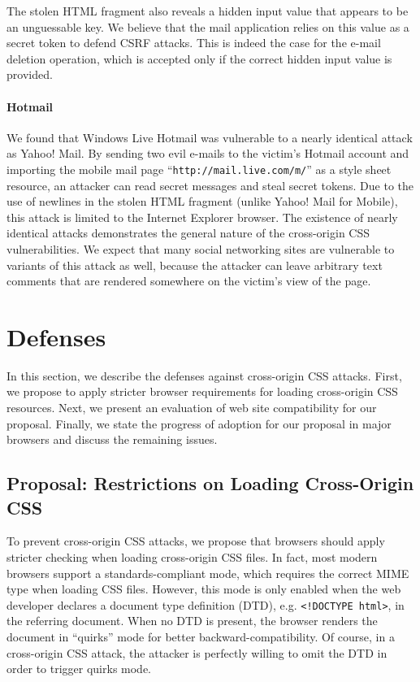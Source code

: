 \documentclass{acm_proc_article-sp}
\begin{document}
The stolen HTML fragment also reveals a hidden input value that appears to be an unguessable key. We believe that the mail application relies on this value as a secret token to defend CSRF attacks. This is indeed the case for the e-mail deletion operation, which is accepted only if the correct hidden input value is provided.

\paragraph{Hotmail}
We found that Windows Live Hotmail was vulnerable to a nearly identical attack as Yahoo! Mail. By sending two evil e-mails to the victim's Hotmail account and importing the mobile mail page ``\texttt{http://mail.live.com/m/}'' as a style sheet resource, an attacker can read secret messages and steal secret tokens. Due to the use of newlines in the stolen HTML fragment (unlike Yahoo! Mail for Mobile), this attack is limited to the Internet Explorer browser.
The existence of nearly identical attacks demonstrates the general nature of the cross-origin CSS vulnerabilities. We expect that many social networking sites are vulnerable to variants of this attack as well, because the attacker can leave arbitrary text comments that are rendered somewhere on the victim's view of the page.

\section{Defenses} \label{sec:defenses}
In this section, we describe the defenses against cross-origin CSS attacks.
First, we propose to apply stricter browser requirements for loading
cross-origin CSS resources. Next, we present an evaluation of web site
compatibility for our proposal. Finally, we state the progress of adoption for
our proposal in major browsers and discuss the remaining issues.

\subsection{Proposal: Restrictions on Loading Cross-Origin CSS} \label{sec:proposal}
To prevent cross-origin
CSS attacks, we propose that browsers should apply stricter checking when
loading cross-origin CSS files. In fact, most modern browsers support a
standards-compliant mode, which requires the correct MIME type when loading CSS
files. However, this mode is only enabled when the web developer declares a
document type definition (DTD), e.g. \verb|<!DOCTYPE html>|, in the referring
document. When no DTD is present, the browser renders the document in
``quirks'' mode for better backward-compatibility. Of course, in a
cross-origin CSS attack, the attacker is perfectly willing to omit the DTD in
order to trigger quirks mode.
\end{document}
